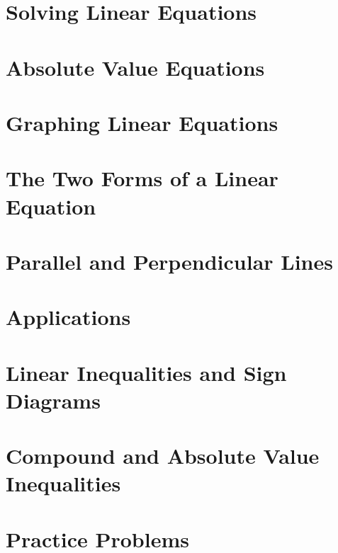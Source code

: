 \section{Solving Linear Equations}

\newpage

\newpage

\newpage

\newpage

\section{Absolute Value Equations}

\newpage

\section{Graphing Linear Equations}

\newpage

\newpage

\newpage

\section{The Two Forms of a Linear Equation}

\newpage

\newpage

\section{Parallel and Perpendicular Lines}

\newpage

\section{Applications}

\newpage

\newpage

\newpage

\section{Linear Inequalities and Sign Diagrams}

\newpage

\newpage

\section{Compound and Absolute Value Inequalities}

\newpage

\newpage

\section{Practice Problems}

\newpage
\closegraphsfile